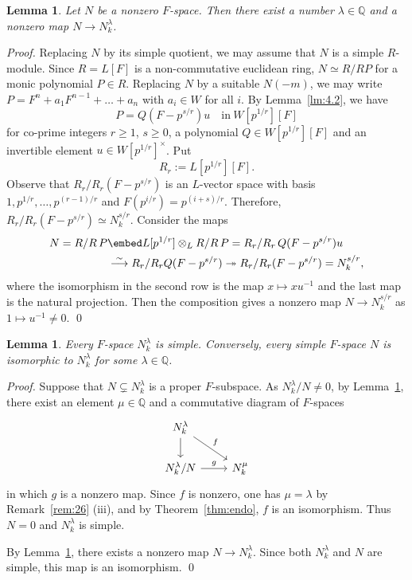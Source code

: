 \documentclass[]{amsart}
\theoremstyle{plain}
\newtheorem{lemma}[thm]{Lemma}
\theoremstyle{definition}
\theoremstyle{remark}
\newcommand{\Q}{\mathbb Q}
\newcommand{\<}{\langle}   %
\renewcommand{\>}{\rangle} %
\newcommand{\isoto}{\stackrel{\sim}{\longrightarrow}}
\def\onto{\twoheadrightarrow}
\begin{document}
\begin{lemma}\label{lm:4.3}
   Let $N$ be a nonzero $F$-space. Then there exist a number $\lambda\in \Q$ and a nonzero map $N\to N^\lambda_k$. 
\end{lemma}
\begin{proof}
    Replacing $N$ by its simple quotient, we may assume that $N$ is a simple $R$-module. Since $R=L[F]$ is a non-commutative euclidean ring, $N\simeq R/RP$ for a monic polynomial $P\in R$. Replacing $N$ by a suitable $N(-m)$, we may write $P=F^{n}+a_1 F^{n-1}+\dots +a_n$ with $a_i\in W$ for all $i$. By Lemma~\ref{lm:4.2}, we have 
    \[ P=Q (F-p^{s/r}) u \quad \text{in}\ W[p^{1/r}][F] \]
    for co-prime integers $r\ge 1$, $s\ge 0$, a polynomial $Q\in W[p^{1/r}][F]$ and an invertible element $u\in W[p^{1/r}]^\times$. 
    Put 
    \[ R_r:=L[p^{1/r}][F]. \] 
    Observe that $R_r/R_r (F-p^{s/r})$ is an $L$-vector space with basis $1,p^{1/r}, \dots, p^{(r-1)/r}$ and $F(p^{i/r})=p^{(i+s)/r}$. Therefore, $R_r/R_r(F-p^{s/r})\simeq N^{s/r}_k$. Consider the maps
    \[ \begin{split}
        N=R/R\, P & \embed L[p^{1/r}]\otimes_{L} R/R\, P=R_r/R_r \, Q(F-p^{s/r})u  \\
        & \isoto R_r/R_r Q(F-p^{s/r}) \onto R_r/R_r (F-p^{s/r})=N^{s/r}_k,
    \end{split}
    \]
    where the isomorphism in the second row is the map $x\mapsto xu^{-1}$ and the last map is the natural projection. Then the composition gives a nonzero map $N \to N^{s/r}_k$ as $1 \mapsto u^{-1}\neq 0$. \qed   
\end{proof}



\begin{lemma}\label{lm:4.4}
   Every $F$-space $N^\lambda_k$ is simple. Conversely, every simple $F$-space $N$ is isomorphic to $N^\lambda_k$ for some $\lambda\in \Q$.
\end{lemma}
\begin{proof}
    Suppose that $N\subsetneq N^\lambda_k$ is a proper $F$-subspace. 
    As $N^\lambda_k/N\neq 0$, by Lemma~\ref{lm:4.3}, there exist an element $\mu\in \Q$ and a commutative diagram of $F$-spaces
    \[ \begin{tikzcd}
        N^\lambda_k \arrow[d] \arrow[dr, "f"] & \\
        N^\lambda_k/N \arrow[r, "g"] & N^\mu_k
    \end{tikzcd}\]
    in which $g$ is a nonzero map. 
    Since $f$ is nonzero, one has $\mu=\lambda$ by Remark~\ref{rem:26} (iii), and by Theorem~\ref{thm:endo}, $f$ is an isomorphism. Thus $N=0$ and $N^\lambda_k$ is simple. 

    By Lemma~\ref{lm:4.3}, there exists a nonzero map $N\to N^\lambda_k$. Since both $N^\lambda_k$ and $N$ are simple, this map is an isomorphism. 
    \qed
\end{proof}
\end{document}

